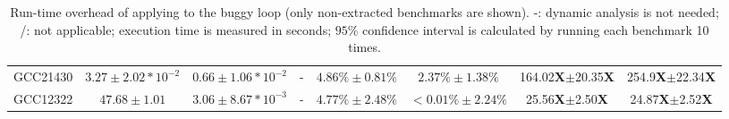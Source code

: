 \begin{table}[tb!]
\begin{tabular}{lccccccc}
      GCC21430    & $3.27\pm2.02*10^{-2}$             & $0.66\pm1.06*10^{-2}$          & -              & $4.86\%\pm0.81\%$ &  $2.37\%\pm1.38\%$                & 164.02{\bf X}$\pm$20.35{\bf X} & 254.9{\bf X}$\pm$22.34{\bf X} \\
      GCC12322    & $47.68\pm1.01$       & $3.06\pm8.67*10^{-3}$          & -              & $4.77\%\pm2.48\%$ &  $<0.01\%\pm2.24\%$               & 25.56{\bf X}$\pm$2.50{\bf X}  & 24.87{\bf X}$\pm$2.52{\bf X} \\
   \bottomrule
   \end{tabular}
  \caption{Run-time overhead of applying \Tool to the buggy loop
    (only non-extracted benchmarks are shown). 
  -: dynamic analysis is not needed;
  /: not applicable;
  execution time is measured in seconds;
  $95\%$ confidence interval is calculated by running each benchmark 10 times.}
  \label{tab:performance}
\end{table}


